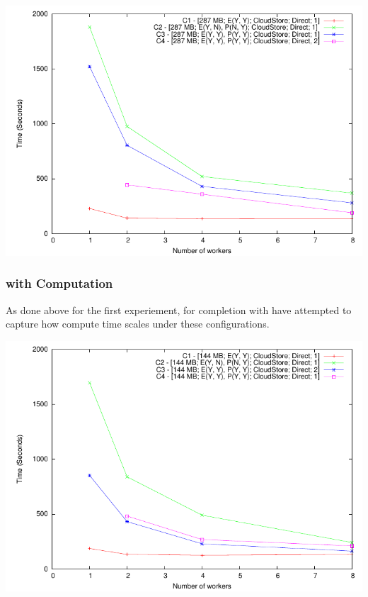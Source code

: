 \documentclass{rspublic}
\begin{document}
\includegraphics{data/graphs/CloudStoreFigure}

\subsubsection{with Computation} As done above for the first
experiement, for completion with have attempted to capture how compute
time scales under these configurations.

\includegraphics{data/graphs/CloudStoreCompute}
\end{document}
